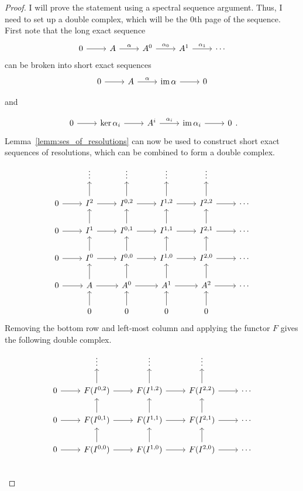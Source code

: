 \begin{proof}
  I will prove the statement using a spectral sequence argument.
  Thus, I need to set up a double complex, which will be the 0th page
  of the sequence. First note that the long exact sequence
  \[\begin{tikzcd}
      0\rar & A\rar{\alpha} & A^{0}\rar{\alpha_{0}} & A^{1}\rar{\alpha_{1}}
      & \cdots
    \end{tikzcd}\]
  can be broken into short exact sequences
  \[\begin{tikzcd}
      0\rar & A\rar{\alpha} & \im\alpha\rar & 0
    \end{tikzcd}\]
  \begin{center}
    and
  \end{center}
  \[\begin{tikzcd}
      0\rar & \ker\alpha_{i}\rar & A^{i}\rar{\alpha_{i}} & \im\alpha_{i}\rar
      & 0
    \end{tikzcd}.\]
  Lemma~\ref{lemm:ses_of_resolutions} can now be used to construct short
  exact sequences of resolutions, which can be combined to form a double
  complex.
  \[\begin{tikzcd}
      & \vdots & \vdots & \vdots & \vdots & \\
      0\rar & I^{2}\uar\rar & I^{0, 2}\uar\rar & I^{1, 2}\uar\rar
      & I^{2, 2}\uar\rar & \cdots \\
      0\rar & I^{1}\uar\rar & I^{0, 1}\uar\rar & I^{1, 1}\uar\rar
      & I^{2, 1}\uar\rar & \cdots \\
      0\rar & I^{0}\uar\rar & I^{0, 0}\uar\rar & I^{1, 0}\uar\rar
      & I^{2, 0}\uar\rar & \cdots \\
      0\rar & A\uar\rar & A^{0}\uar\rar & A^{1}\uar\rar & A^{2}\uar\rar
      & \cdots \\
      & 0\uar & 0\uar & 0\uar & 0\uar &
    \end{tikzcd}\]
  Removing the bottom row and left-most column and applying the functor
  $F$ gives the following double complex.
  \[\begin{tikzcd}
      & \vdots & \vdots & \vdots & \\
      0\rar & F(I^{0,2})\uar\rar & F(I^{1, 2})\uar\rar
      & F(I^{2, 2})\uar\rar & \cdots \\
      0\rar & F(I^{0,1})\uar\rar & F(I^{1, 1})\uar\rar
      & F(I^{2, 1})\uar\rar & \cdots \\
      0\rar & F(I^{0,0})\uar\rar & F(I^{1, 0})\uar\rar
      & F(I^{2, 0})\uar\rar & \cdots \\

\end{tikzcd}\]
\end{proof}
